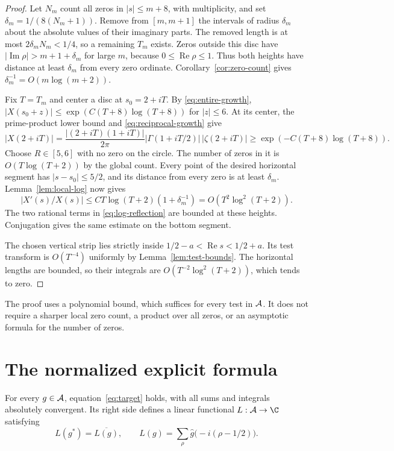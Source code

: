 \begin{proof}
Let $N_m$ count all zeros in $|s|\leq m+8$, with multiplicity, and set
$\delta_m=1/(8(N_m+1))$.
Remove from $[m,m+1]$ the intervals of radius $\delta_m$ about the absolute
values of their imaginary parts.
The removed length is at most $2\delta_mN_m<1/4$, so a remaining $T_m$ exists.
Zeros outside this disc have $|\operatorname{Im}\rho|>m+1+\delta_m$
for large $m$, because $0\leq\operatorname{Re}\rho\leq1$.
Thus both heights have distance at least $\delta_m$ from every zero ordinate.
Corollary~\ref{cor:zero-count} gives
$\delta_m^{-1}=O(m\log(m+2))$.

Fix $T=T_m$ and center a disc at $s_0=2+iT$.
By \eqref{eq:entire-growth},
$|X(s_0+z)|\leq\exp(C(T+8)\log(T+8))$ for $|z|\leq6$.
At its center, the prime-product lower bound and
\eqref{eq:reciprocal-growth} give
\[
 |X(2+iT)|
 =\frac{|(2+iT)(1+iT)|}{2\pi}
       |\Gamma(1+iT/2)|\,|\zeta(2+iT)|
 \geq\exp(-C(T+8)\log(T+8)).
\]
Choose $R\in[5,6]$ with no zero on the circle.
The number of zeros in it is $O(T\log(T+2))$ by the global count.
Every point of the desired horizontal segment has $|s-s_0|\leq5/2$,
and its distance from every zero is at least $\delta_m$.
Lemma~\ref{lem:local-log} now gives
\[
 |X'(s)/X(s)|
 \leq C T\log(T+2)(1+\delta_m^{-1})
 =O(T^2\log^2(T+2)).
\]
The two rational terms in \eqref{eq:log-reflection} are bounded at these
heights.  Conjugation gives the same estimate on the bottom segment.

The chosen vertical strip lies strictly inside
$1/2-a<\operatorname{Re}s<1/2+a$.
Its test transform is $O(T^{-4})$ uniformly by
Lemma~\ref{lem:test-bounds}.
The horizontal lengths are bounded, so their integrals are
$O(T^{-2}\log^2(T+2))$, which tends to zero.
\end{proof}

The proof uses a polynomial bound, which suffices for every test in $\mathcal A$.
It does not require a sharper local zero count, a product over all zeros,
or an asymptotic formula for the number of zeros.

\section{The normalized explicit formula}
\label{sec:formula}

\begin{theorem}
\label{thm:explicit}
For every $g\in\mathcal A$, equation~\eqref{eq:target} holds, with all sums and
integrals absolutely convergent.
Its right side defines a linear functional $L:\A\to\C$ satisfying
\begin{equation}
 L(g^*)=\overline{L(g)},\qquad
 L(g)=\sum_\rho\widehat g\bigl(-i(\rho-1/2)\bigr).
 \label{eq:functional}
\end{equation}
\end{theorem}

